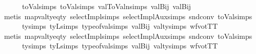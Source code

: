 \begin{isabellebody}
\ \ \ \ \ \ toVal{}{\isachardot}{\kern0pt}simps{\isacharparenleft}{\kern0pt}{}{\isacharparenright}{\kern0pt}\ toVal{}{}{}{}{\isachardot}{\kern0pt}simps{\isacharparenleft}{\kern0pt}{}{\isacharcomma}{\kern0pt}{}{\isacharparenright}{\kern0pt}\ val{}ToValn{\isachardot}{\kern0pt}simps{\isacharparenleft}{\kern0pt}{}{\isacharparenright}{\kern0pt}\ valBij\ valBij{}{\isacharparenright}{\kern0pt}\isanewline
\ \ \isamarkupfalse%
\ {\isacharparenleft}{\kern0pt}metis\ mapval{\isacharunderscore}{\kern0pt}ty{\isacharunderscore}{\kern0pt}eq{\isacharunderscore}{\kern0pt}ty{}{}{}\ selectImpl{\isachardot}{\kern0pt}simps\ selectImplAux{\isachardot}{\kern0pt}simps{\isacharparenleft}{\kern0pt}{}{}{\isacharparenright}{\kern0pt}\ snd{\isacharunderscore}{\kern0pt}conv\ toVal{}{}{}{}{\isachardot}{\kern0pt}simps{\isacharparenleft}{\kern0pt}{}{\isacharparenright}{\kern0pt}\isanewline
\ \ \ \ \ \ ty{}{}{}{\isachardot}{\kern0pt}simps{\isacharparenleft}{\kern0pt}{}{\isacharparenright}{\kern0pt}\ tyL{\isachardot}{\kern0pt}simps\ type{\isacharunderscore}{\kern0pt}of{\isacharunderscore}{\kern0pt}val{\isachardot}{\kern0pt}simps{\isacharparenleft}{\kern0pt}{}{\isacharparenright}{\kern0pt}\ valBij{}\ val{\isacharunderscore}{\kern0pt}ty{\isachardot}{\kern0pt}simps{\isacharparenleft}{\kern0pt}{}{\isacharparenright}{\kern0pt}\ wfvotTT{\isacharparenright}{\kern0pt}\isanewline
\ \ \isamarkupfalse%
\ {\isacharparenleft}{\kern0pt}metis\ mapval{\isacharunderscore}{\kern0pt}ty{\isacharunderscore}{\kern0pt}eq{\isacharunderscore}{\kern0pt}ty{}{}{}\ selectImpl{\isachardot}{\kern0pt}simps\ selectImplAux{\isachardot}{\kern0pt}simps{\isacharparenleft}{\kern0pt}{}{}{\isacharparenright}{\kern0pt}\ snd{\isacharunderscore}{\kern0pt}conv\ toVal{}{}{}{}{\isachardot}{\kern0pt}simps{\isacharparenleft}{\kern0pt}{}{\isacharcomma}{\kern0pt}{}{\isacharparenright}{\kern0pt}\isanewline
\ \ \ \ \ \ ty{}{}{}{\isachardot}{\kern0pt}simps{\isacharparenleft}{\kern0pt}{}{\isacharparenright}{\kern0pt}\ tyL{\isachardot}{\kern0pt}simps\ type{\isacharunderscore}{\kern0pt}of{\isacharunderscore}{\kern0pt}val{\isachardot}{\kern0pt}simps{\isacharparenleft}{\kern0pt}{}{\isacharparenright}{\kern0pt}\ valBij{}\ val{\isacharunderscore}{\kern0pt}ty{\isachardot}{\kern0pt}simps{\isacharparenleft}{\kern0pt}{}{\isacharparenright}{\kern0pt}\ wfvotTT{\isacharparenright}{\kern0pt}\isanewline

\end{isabellebody}
